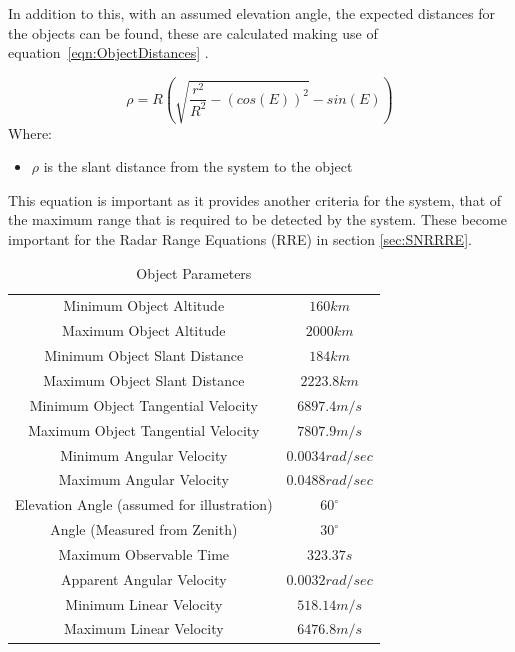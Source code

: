 \documentclass[11pt]{witseiepaper}
\begin{document}
In addition to this, with an assumed elevation angle, the expected distances for the objects can be found, these are calculated making use of equation~\ref{eqn:ObjectDistances} \cite{ObservableTime}.


\begin{equation} \label{eqn:ObjectDistances}
    \rho = R (\sqrt{\frac{r^2}{R^2} - (cos(E))^2} - sin(E))
    \end{equation}
Where:
\begin{itemize}
    \item $\rho$ is the slant distance from the system to the object
\end{itemize}
This equation is important as it provides another criteria for the system, that of the maximum range that is required to be detected by the system. These become important for the Radar Range Equations (RRE) in section \ref{sec:SNRRRE}.


\begin{table}
    \begin{center}
        \begin{tabular}{ c c }
            \hline 
            Minimum Object Altitude & $160 km$ \\
            Maximum Object Altitude & $2000 km$ \\
            Minimum Object Slant Distance & $184 km$ \\
            Maximum Object Slant Distance & $2223.8 km$ \\            
            Minimum Object Tangential Velocity & $6897.4 m/s$ \\
            Maximum Object Tangential Velocity & $7807.9 m/s$ \\
            Minimum Angular Velocity & $0.0034 rad/sec$ \\
            Maximum Angular Velocity & $0.0488 rad/sec$ \\
            Elevation Angle (assumed for illustration) & $60^{\circ}$ \\
            Angle (Measured from Zenith) & $30^{\circ}$ \\
            Maximum Observable Time & $323.37 s$ \\
            Apparent Angular Velocity & $0.0032 rad/sec$ \\
            Minimum Linear Velocity & $518.14 m/s$ \\
            Maximum Linear Velocity & $6476.8 m/s$ \\
        \end{tabular}
        \caption{Object Parameters}
        \label{tab:ObjectParameters}
    \end{center}
\end{table}
\end{document}
